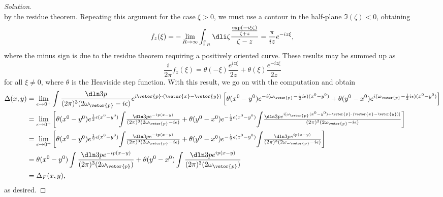 \begin{proof}[Solution]
\begin{equation*}
   \end{equation*}
   by the residue theorem. Repeating this argument for the case \(\xi > 0\), we must use a contour in the half-plane \(\Im(\zeta) < 0\), obtaining
   \begin{equation*}
      f_z(\xi) = - \lim_{R \to \infty} \int_{\tilde{\Gamma}_R}\dli\zeta \frac{\frac{\exp(-i \xi \zeta)}{\zeta + z}}{\zeta - z} = \frac{\pi}{iz}e^{-iz \xi},
   \end{equation*}
   where the minus sign is due to the residue theorem requiring a positively oriented curve. These results may be summed up as
   \begin{equation*}
      \frac{i}{2\pi} f_z(\xi) = \theta(-\xi) \frac{e^{iz \xi}}{2z} + \theta(\xi) \frac{e^{-iz\xi}}{2z}
   \end{equation*}
   for all \(\xi \neq 0\), where \(\theta\) is the Heaviside step function. With this result, we go on with the computation and obtain
   \begin{align*}
      \Delta(x,y)
      &= \lim_{\epsilon \to 0^+} \int \frac{\dln3p}{(2\pi)^3 (2 \omega_{\vetor{p}} - i \epsilon)} e^{i \vetor{p} \cdot (\vetor{x} - \vetor{y})} \left[\theta(x^0 - y^0) e^{-i (\omega_{\vetor{p}} - \frac12 i \epsilon) (x^0 - y^0)} + \theta(y^0 - x^0) e^{i (\omega_{\vetor{p}} - \frac12 i \epsilon)(x^0 - y^0)}\right]\\
      &= \lim_{\epsilon\to0^+}\textstyle\left[\theta(x^0 - y^0) e^{\frac12 \epsilon (x^0 - y^0)}{\displaystyle\int}\frac{\dln3p e^{-i p (x - y)}}{(2\pi)^3(2 \omega_{\vetor{p}}- i \epsilon)}  + \theta(y^0 - x^0) e^{-\frac12 \epsilon (x^0 - y^0)} {\displaystyle\int}\frac{\dln3p e^{i[\omega_{\vetor{p}}(x^0 - y^0) + \vetor{p}\cdot (\vetor{x} - \vetor{y})]}}{(2\pi)^3(2 \omega_{\vetor{p}} - i \epsilon)}\right]\\
      &= \lim_{\epsilon\to0^+}\textstyle\left[\theta(x^0 - y^0) e^{\frac12 \epsilon (x^0 - y^0)}{\displaystyle\int}\frac{\dln3p e^{-i p (x - y)}}{(2\pi)^3(2 \omega_{\vetor{p}}- i \epsilon)}  + \theta(y^0 - x^0) e^{-\frac12 \epsilon (x^0 - y^0)} {\displaystyle\int}\frac{\dln3p e^{i p (x - y)}}{(2\pi)^3(2 \omega_{-\vetor{p}} - i \epsilon)}\right]\\
      &= \theta(x^0 - y^0) \int \frac{\dln3p e^{-ip(x - y)}}{(2\pi)^3(2\omega_{\vetor{p}})} + \theta(y^0 - x^0) \int \frac{\dln3p e^{ip(x - y)}}{(2\pi)^3(2\omega_{\vetor{p}})}\\
      &= \Delta_F(x,y),
   \end{align*}
   as desired.
\end{proof}
